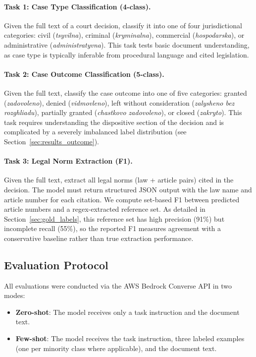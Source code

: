 \documentclass[11pt,a4paper]{article}
\begin{document}
\paragraph{Task 1: Case Type Classification (4-class).}
Given the full text of a court decision, classify it into one of four jurisdictional categories: civil (\textit{tsyvilna}), criminal (\textit{kryminalna}), commercial (\textit{hospodarska}), or administrative (\textit{administratyvna}). This task tests basic document understanding, as case type is typically inferable from procedural language and cited legislation.

\paragraph{Task 2: Case Outcome Classification (5-class).}
Given the full text, classify the case outcome into one of five categories: granted (\textit{zadovoleno}), denied (\textit{vidmovleno}), left without consideration (\textit{zalysheno bez rozghliadu}), partially granted (\textit{chastkovo zadovoleno}), or closed (\textit{zakryto}). This task requires understanding the dispositive section of the decision and is complicated by a severely imbalanced label distribution (see Section~\ref{sec:results_outcome}).

\paragraph{Task 3: Legal Norm Extraction (F1).}
Given the full text, extract all legal norms (law + article pairs) cited in the decision. The model must return structured JSON output with the law name and article number for each citation. We compute set-based F1 between predicted article numbers and a regex-extracted reference set. As detailed in Section~\ref{sec:gold_labels}, this reference set has high precision (91\%) but incomplete recall (55\%), so the reported F1 measures agreement with a conservative baseline rather than true extraction performance.

\subsection{Evaluation Protocol}
\label{sec:protocol}

All evaluations were conducted via the AWS Bedrock Converse API in two modes:

\begin{itemize}[leftmargin=*]
    \item \textbf{Zero-shot}: The model receives only a task instruction and the document text.
    \item \textbf{Few-shot}: The model receives the task instruction, three labeled examples (one per minority class where applicable), and the document text.
\end{itemize}
\end{document}
